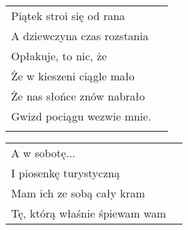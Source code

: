 \documentclass[a5paper]{article}
\begin{document}
\noindent
\begin{tabular}{@{}p{7.50cm}p{3cm}@{}}
Piątek stroi się od rana \\
A dziewczyna czas rozstania \\
Opłakuje, to nic, że \\
Że w kieszeni ciągle mało \\
Że nas słońce znów nabrało \\
Gwizd pociągu wezwie mnie. \\ \\
\end{tabular}

\noindent
\begin{tabular}{@{}p{7.50cm}p{3cm}@{}}
A w sobotę... \\
I piosenkę turystyczną \\
Mam ich ze sobą cały kram \\
Tę, którą właśnie śpiewam wam
\end{tabular}
\end{document}
